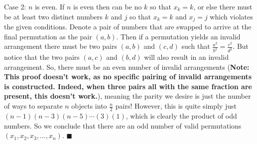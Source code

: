 \begin{enumerate}
 Case 2:  $n$ is even.  If $n$ is even then can be no $k$ so that $x_k=k$, or else there must be at least two distinct numbers $k$ and $j$ so that $x_k=k$ and $x_j=j$ which violates the given conditions.  Denote a pair of numbers that are swapped to arrive at the final permutation as the pair $(a,b)$.  Then if a permutation yields an invalid arrangement there must be two pairs $(a,b)$ and $(c,d)$ such that $\frac{a^2}{b^2} = \frac{c^2}{d^2}$.  But notice that the two pairs $(a,c)$ and $(b,d)$ will also result in an invalid arrangement. So, there must be an even number of invalid arrangements (\textbf{Note: This proof doesn't work, as no specific pairing of invalid arrangements is constructed. Indeed, when three pairs all with the same fraction are present, this doesn't work.}), meaning the parity we desire is just the number of ways to separate $n$ objects into $\frac n2$ pairs!  However, this is quite simply just $(n-1)(n-3)(n-5)\cdots(3)(1)$, which is clearly the product of odd numbers.  So we conclude that there are an odd number of valid permutations $(x_1,x_2,x_3,\dots,x_n)$.  $\blacksquare$



\end{enumerate}